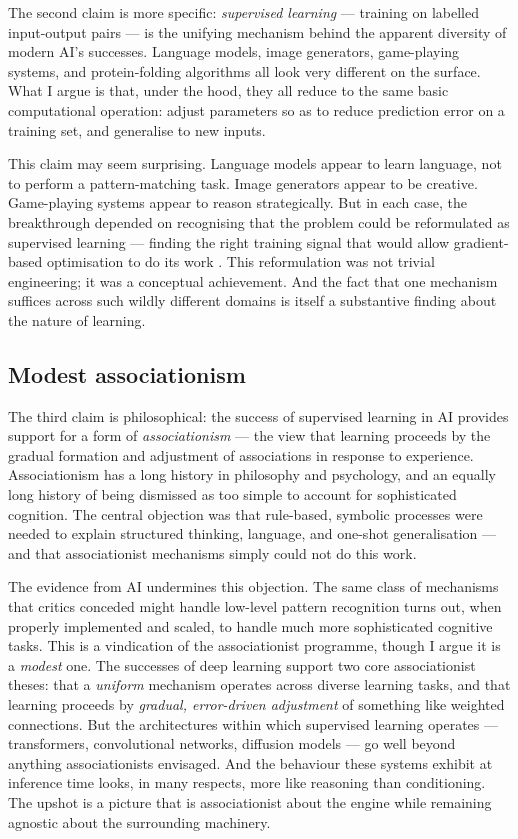 \documentclass{drpaper}
\begin{document}
The second claim is more specific: \emph{supervised learning} — training on labelled input-output pairs — is the unifying mechanism behind the apparent diversity of modern AI's successes. Language models, image generators, game-playing systems, and protein-folding algorithms all look very different on the surface. What I argue is that, under the hood, they all reduce to the same basic computational operation: adjust parameters so as to reduce prediction error on a training set, and generalise to new inputs.

This claim may seem surprising. Language models appear to learn language, not to perform a pattern-matching task. Image generators appear to be creative. Game-playing systems appear to reason strategically. But in each case, the breakthrough depended on recognising that the problem could be reformulated as supervised learning — finding the right training signal that would allow gradient-based optimisation to do its work \citep{deeplearninglecun}. This reformulation was not trivial engineering; it was a conceptual achievement. And the fact that one mechanism suffices across such wildly different domains is itself a substantive finding about the nature of learning.

\subsection{Modest associationism}

The third claim is philosophical: the success of supervised learning in AI provides support for a form of \emph{associationism} — the view that learning proceeds by the gradual formation and adjustment of associations in response to experience. Associationism has a long history in philosophy and psychology, and an equally long history of being dismissed as too simple to account for sophisticated cognition. The central objection was that rule-based, symbolic processes were needed to explain structured thinking, language, and one-shot generalisation — and that associationist mechanisms simply could not do this work.

The evidence from AI undermines this objection. The same class of mechanisms that critics conceded might handle low-level pattern recognition turns out, when properly implemented and scaled, to handle much more sophisticated cognitive tasks. This is a vindication of the associationist programme, though I argue it is a \emph{modest} one. The successes of deep learning support two core associationist theses: that a \emph{uniform} mechanism operates across diverse learning tasks, and that learning proceeds by \emph{gradual, error-driven adjustment} of something like weighted connections. But the architectures within which supervised learning operates — transformers, convolutional networks, diffusion models — go well beyond anything associationists envisaged. And the behaviour these systems exhibit at inference time looks, in many respects, more like reasoning than conditioning. The upshot is a picture that is associationist about the engine while remaining agnostic about the surrounding machinery.
\end{document}
